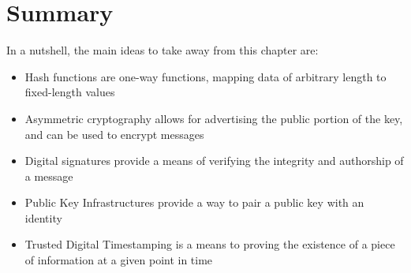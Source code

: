 \section{Summary}
In a nutshell, the main ideas to take away from this chapter are:
\begin{itemize}
    \item Hash functions are one-way functions, mapping data of arbitrary length to fixed-length values
    \item Asymmetric cryptography allows for advertising the public portion of the key, and can be used to encrypt messages
    \item Digital signatures provide a means of verifying the integrity and authorship of a message
    \item Public Key Infrastructures provide a way to pair a public key with an identity
    \item Trusted Digital Timestamping is a means to proving the existence of a piece of information at a given point in time
\end{itemize}
